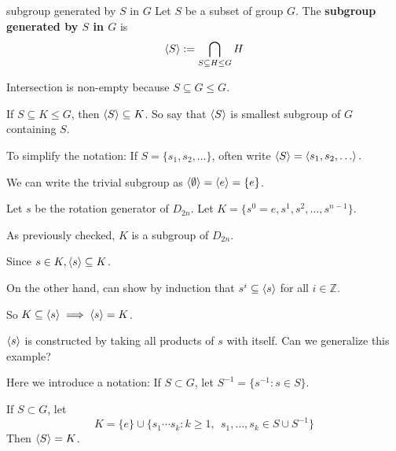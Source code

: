 \begin{defn}{subgroup generated by $S$ in $G$}
Let $S$ be a subset of group $G$.
The \textbf{subgroup generated by $S$ in $G$} is 
$$\left\langle S \right\rangle:=\bigcap_{S\subseteq H \le G}H$$
\end{defn}

\begin{note}
Intersection is non-empty because $S\subseteq G\le G$.

If $S\subseteq K\le G$, then $\left\langle S \right\rangle\subseteq K$. So say that $\left\langle S \right\rangle$ is smallest subgroup of $G$ containing $S$.

To simplify the notation: If $S=\{s_1,s_2,\ldots\}$, often write $\left\langle S \right\rangle=\left\langle s_1,s_2,\ldots \right\rangle.$

We can write the trivial subgroup as $\left\langle \emptyset \right\rangle = \left\langle e \right\rangle = \{e\}$.
\end{note}

\begin{ex}[$D_{2n}$]
Let $s$ be the rotation generator of $D_{2n}$. Let $K=\{s^0=e,s^1,s^2,\ldots,s^{n-1}\}$.

As previously checked, $K$ is a subgroup of $D_{2n}$.

Since $s\in K, \left\langle s \right\rangle\subseteq K$. 

On the other hand, can show by induction that $s^i\subseteq \left\langle s \right\rangle$ for all $i\in\mathbb Z$.

So $K\subseteq \left\langle s \right\rangle \implies \left\langle s \right\rangle=K$.
\end{ex}

$\left\langle s \right\rangle$ is constructed by taking all products of $s$ with itself. Can we generalize this example?

Here we introduce a notation: If $S\subset G$, let $S^{-1}=\{s^{-1}:s\in S\}$.

\begin{prop}
If $S\subset G$, let 
$$K=\{e\}\cup \{s_1\cdots s_k: k\ge 1,~~s_1,\ldots,s_k \in S\cup S^{-1}\}$$
Then $\left\langle S \right\rangle=K$.
\end{prop}



